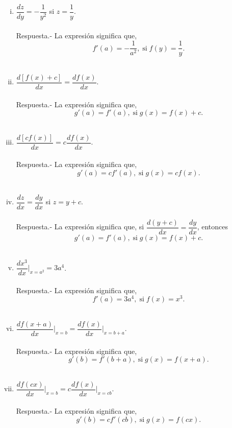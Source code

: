 \begin{enumerate}[\bfseries 1]
\begin{enumerate}[(i)]
	    \item $\dfrac{dz}{dy}=-\dfrac{1}{y^2}$ si $z=\dfrac{1}{y}$.\\\\
		Respuesta.-\; La expresión significa que,
		$$f'(a)=-\dfrac{1}{a^2},\; \mbox{si}\; f(y)=\dfrac{1}{y}.$$\\

	    \item $\dfrac{d[f(x)+c]}{dx}=\dfrac{df(x)}{dx}$.\\\\
		Respuesta.-\; La expresión significa que,
		$$g'(a)=f'(a),\; \mbox{si}\; g(x)=f(x)+c.$$\\

	    \item $\dfrac{d[cf(x)]}{dx}=c\dfrac{df(x)}{dx}$.\\\\
		Respuesta.-\; La expresión significa que,
		$$g'(a)=cf'(a),\; \mbox{si}\; g(x)=cf(x).$$\\

	    \item $\dfrac{dz}{dx}=\dfrac{dy}{dx}$ si $z=y+c$.\\\\
		Respuesta.-\; La expresión significa que, si $\dfrac{d(y+c)}{dx}=\dfrac{dy}{dx}$, entonces
		$$g'(a)=f'(a),\; \mbox{si}\; g(x)=f(x)+c.$$\\

	    \item $\dfrac{dx^3}{dx}\bigg|_{x=a^2}=3a^4$.\\\\
		Respuesta.-\; La expresión significa que,
		$$f'(a)=3a^4,\; \mbox{si}\; f(x)=x^3.$$\\

	    \item $\dfrac{df(x+a)}{dx}\bigg|_{x=b}=\dfrac{df(x)}{dx}\bigg|_{x=b+a}$.\\\\
		Respuesta.-\; La expresión significa que,
		$$g'(b)=f'(b+a),\; \mbox{si}\; g(x)=f(x+a).$$\\

	    \item $\dfrac{df(cx)}{dx}\bigg|_{x=b}=c\dfrac{df(x)}{dx}\bigg|_{x=cb}$.\\\\
		Respuesta.-\; La expresión significa que,
		$$g'(b)=cf'(cb),\; \mbox{si}\; g(x)=f(cx).$$\\


\end{enumerate}
\end{enumerate}
